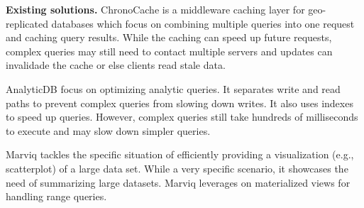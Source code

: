 \documentclass[sigplan,twocolumn,review,anonymous]{acmart}
\begin{document}
\noindent
\textbf{Existing solutions.}
ChronoCache \cite{chronocache} is a middleware caching layer for geo-replicated databases which focus on combining multiple queries into one request and caching query results.
While the caching can speed up future requests, complex queries may still need to contact multiple servers and updates can invalidade the cache or else clients read stale data.

AnalyticDB \cite{analyticdb} focus on optimizing analytic queries. 
It separates write and read paths to prevent complex queries from slowing down writes. 
It also uses indexes to speed up queries. 
However, complex queries still take hundreds of milliseconds to execute and may slow down  simpler queries.



Marviq \cite{marviq} tackles the specific situation of efficiently providing a visualization (e.g., scatterplot) of a large data set.
While a very specific scenario, it showcases the need of summarizing large datasets.
Marviq leverages on materialized views for handling range queries.
\end{document}
